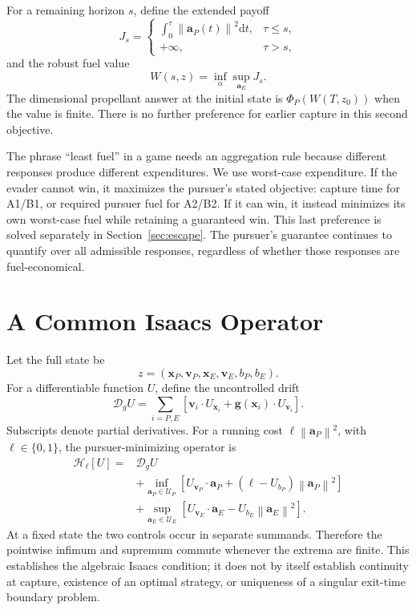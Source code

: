 \documentclass[journal,a4paper]{IEEEtran}
\newcommand{\U}{\mathcal U}
\newcommand{\D}{\mathcal D}
\newcommand{\HH}{\mathcal H}
\newcommand{\norm}[1]{\left\|#1\right\|}
\newcommand{\dd}{\mathrm d}
\begin{document}
For a remaining horizon $s$, define the extended payoff
\begin{equation}
 J_s=
 \begin{cases}
 \displaystyle\int_0^\tau\norm{\mathbf a_P(t)}^2\dd t,
                                      &\tau\le s,\\
 +\infty,&\tau>s,
 \end{cases}
 \label{eq:Jfuel}
\end{equation}
and the robust fuel value
\begin{equation}
 W(s,z)=\inf_\alpha\sup_{\mathbf a_E}J_s.
 \label{eq:fuelvalue}
\end{equation}
The dimensional propellant answer at the initial state is $\Phi_P(W(T,z_0))$ when the value is finite. There is no further preference for earlier capture in this second objective.

The phrase ``least fuel'' in a game needs an aggregation rule because different responses produce different expenditures. We use worst-case expenditure. If the evader cannot win, it maximizes the pursuer's stated objective: capture time for A1/B1, or required pursuer fuel for A2/B2. If it can win, it instead minimizes its own worst-case fuel while retaining a guaranteed win. This last preference is solved separately in Section~\ref{sec:escape}. The pursuer's guarantee continues to quantify over all admissible responses, regardless of whether those responses are fuel-economical.

\section{A Common Isaacs Operator}
\label{sec:isaacs}
Let the full state be
\begin{equation}
 z=(\mathbf x_P,\mathbf v_P,\mathbf x_E,\mathbf v_E,b_P,b_E).
\end{equation}
For a differentiable function $U$, define the uncontrolled drift
\begin{equation}
 \D_g U=\sum_{i=P,E}
 \left[\mathbf v_i\cdot U_{\mathbf x_i}
       +\mathbf g(\mathbf x_i)\cdot U_{\mathbf v_i}\right].
 \label{eq:drift}
\end{equation}
Subscripts denote partial derivatives. For a running cost $\ell\norm{\mathbf a_P}^2$, with $\ell\in\{0,1\}$, the pursuer-minimizing operator is
\begin{align}
 \HH_\ell[U]={}&\D_g U\nonumber\\
 &+\inf_{\mathbf a_P\in\U_P}
 \left[U_{\mathbf v_P}\cdot\mathbf a_P
             +(\ell-U_{b_P})\norm{\mathbf a_P}^2\right]\nonumber\\
 &+\sup_{\mathbf a_E\in\U_E}
 \left[U_{\mathbf v_E}\cdot\mathbf a_E
                         -U_{b_E}\norm{\mathbf a_E}^2\right].
 \label{eq:Hgeneral}
\end{align}
At a fixed state the two controls occur in separate summands. Therefore the pointwise infimum and supremum commute whenever the extrema are finite. This establishes the algebraic Isaacs condition; it does not by itself establish continuity at capture, existence of an optimal strategy, or uniqueness of a singular exit-time boundary problem.
\end{document}

